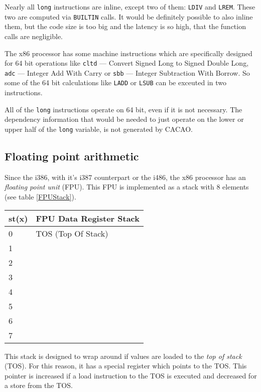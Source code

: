Nearly all \texttt{long} instructions are inline, except two of them:
\texttt{LDIV} and \texttt{LREM}. These two are computed via
\texttt{BUILTIN} calls. It would be definitely possible to also
inline them, but the code size is too big and the latency is so high,
that the function calls are negligible.

The x86 processor has some machine instructions which are specifically
designed for 64 bit operations like \texttt{cltd} --- Convert Signed
Long to Signed Double Long, \texttt{adc} --- Integer Add With Carry or
\texttt{sbb} --- Integer Subtraction With Borrow. So some of the 64
bit calculations like \texttt{LADD} or \texttt{LSUB} can be exceuted
in two instructions.

All of the \texttt{long} instructions operate on 64 bit, even if it is
not necessary. The dependency information that would be needed to just
operate on the lower or upper half of the \texttt{long} variable, is
not generated by CACAO.


\subsection{Floating point arithmetic}

Since the i386, with it's i387 counterpart or the i486, the x86
processor has an \textit{floating point unit} (FPU). This FPU is
implemented as a stack with 8 elements (see table \ref{FPUStack}).

\begin{table*}
\begin{center}
\begin{tabular}[b]{|l|l|}
\hline 
st(x) & FPU Data Register Stack \\ \hline
0     & TOS (Top Of Stack) \\ \hline
1     & \\ \hline
2     & \\ \hline
3     & \\ \hline
4     & \\ \hline
5     & \\ \hline
6     & \\ \hline
7     & \\ \hline
\end{tabular}
\caption{x87 FPU Data Register Stack}
\label{FPUStack}
\end{center}
\end{table*}

This stack is designed to wrap around if values are loaded to the
\textit{top of stack} (TOS). For this reason, it has a special register which
points to the TOS. This pointer is increased if a load instruction to
the TOS is executed and decreased for a store from the TOS.

